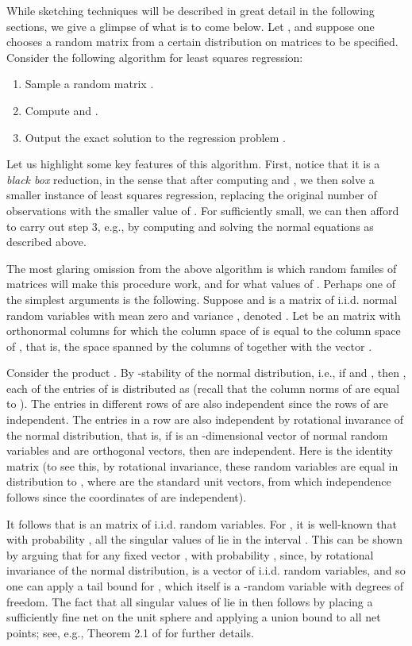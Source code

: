 \documentclass[11pt]{article}
\begin{document}
While sketching techniques will be described in great detail in the following sections,
we give a glimpse of what is to come below. Let , 
and suppose one chooses a
 random matrix  from a certain distribution on matrices
to be specified. 
Consider the following algorithm for least squares regression: 
\begin{enumerate}
\item Sample a random matrix .
\item Compute  and .
\item Output the exact solution  to the regression problem . 
\end{enumerate}
Let us highlight some key features of this algorithm. First, notice that it is a 
{\it black box} reduction, in the sense that after computing 
and , we then solve a smaller instance of least squares regression,
replacing the original number  of observations with the smaller value of . For
 sufficiently small, we can then afford to carry out step 3, e.g., by computing
and solving the normal equations as described above. 

The most glaring omission from the above algorithm is which random familes of matrices
 will make this procedure work, and for what values of . Perhaps one of the
simplest arguments is the following. Suppose  and 
is a  matrix of i.i.d. normal random variables with mean 
zero and variance , denoted . Let  be an 
matrix with orthonormal columns for which the column space of  is equal to
the column space of , that is, the space spanned by the columns of 
together with the vector . 

Consider the product . By -stability of the normal
distribution, i.e., if  and ,
then , each of the entries of 
is distributed as  (recall that the column norms of  are equal to ). 
The entries in different rows of  are also independent
since the rows of  are independent. The entries in a row
are also independent by rotational invarance of the normal distribution, that is,
if  is an -dimensional vector of normal random variables
and  are orthogonal vectors, then  are independent. 
Here  is the  identity matrix
(to see this, by rotational invariance, these  random variables are equal in
distribution to , where  are the standard unit vectors,
from which independence follows since the coordinates of  are independent). 

It follows that  is an  matrix of i.i.d. 
random variables. For , it is well-known that with
probability , all the singular
values of  lie in the interval 
. This can be shown by arguing that for any fixed vector , 
 with probability , 
since, by rotational invariance of the normal distribution, 
 is a vector of 
i.i.d.  random variables, and so one can apply a tail bound for
, which itself is a -random variable with  degrees
of freedom. The fact that all singular values of  lie in 
 then follows by placing a sufficiently fine net on the unit sphere
and applying a union bound to all net points; 
see, e.g., Theorem 2.1 of \cite{RV10} for further details. 
\end{document}
